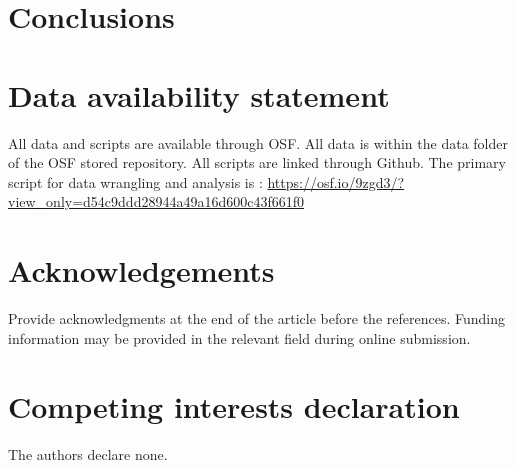 \section{Conclusions}


 
\section{Data availability statement}
All data and scripts are available through OSF. All data is within the data folder of the OSF stored repository. All scripts are linked through Github. The primary script for data wrangling and analysis is : \url{https://osf.io/9zgd3/?view_only=d54c9ddd28944a49a16d600c43f661f0}

\section{Acknowledgements}
Provide acknowledgments at the end of the article before the references. Funding information may be provided in the relevant field during online submission. 

\section{Competing interests declaration}
The authors declare none.
